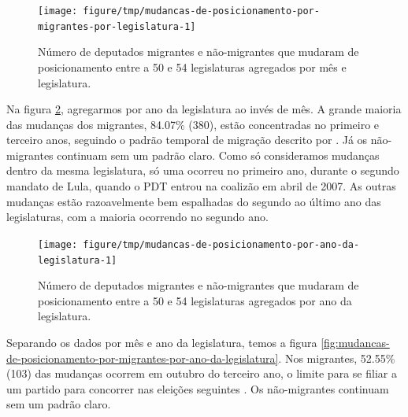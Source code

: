 \documentclass[a4paper,titlepage]{ppgi}\usepackage[]{graphicx}\usepackage[]{color}
\newenvironment{knitrout}{}{} %
\begin{document}
\begin{knitrout}
\color{fgcolor}\begin{figure}
\texttt{[image: figure/tmp/mudancas-de-posicionamento-por-migrantes-por-legislatura-1]} \caption[Número de deputados migrantes e não-migrantes que mudaram de posicionamento entre a 50\textordfeminine{} e 54\textordfeminine{} legislaturas agregados por mês e legislatura]{Número de deputados migrantes e não-migrantes que mudaram de posicionamento entre a 50\textordfeminine{} e 54\textordfeminine{} legislaturas agregados por mês e legislatura.}\label{fig:mudancas-de-posicionamento-por-migrantes-por-legislatura}
\end{figure}


\end{knitrout}

Na figura \ref{fig:mudancas-de-posicionamento-por-ano-da-legislatura},
agregarmos por ano da legislatura ao invés de mês. A grande maioria das
mudanças dos migrantes,
84.07\%
(380), estão concentradas no
primeiro e terceiro anos, seguindo o padrão temporal de migração descrito por
. Já os não-migrantes continuam sem um padrão claro.
Como só consideramos mudanças dentro da mesma legislatura, só uma ocorreu no
primeiro ano, durante o segundo mandato de Lula, quando o PDT entrou na
coalizão em abril de 2007. As outras mudanças estão razoavelmente bem
espalhadas do segundo ao último ano das legislaturas, com a maioria ocorrendo
no segundo ano.

\begin{knitrout}
\color{fgcolor}\begin{figure}
\texttt{[image: figure/tmp/mudancas-de-posicionamento-por-ano-da-legislatura-1]} \caption[Número de deputados migrantes e não-migrantes que mudaram de posicionamento entre a 50\textordfeminine{} e 54\textordfeminine{} legislaturas agregados por ano da legislatura]{Número de deputados migrantes e não-migrantes que mudaram de posicionamento entre a 50\textordfeminine{} e 54\textordfeminine{} legislaturas agregados por ano da legislatura.}\label{fig:mudancas-de-posicionamento-por-ano-da-legislatura}
\end{figure}


\end{knitrout}

Separando os dados por mês e ano da legislatura, temos a figura
\ref{fig:mudancas-de-posicionamento-por-migrantes-por-ano-da-legislatura}. Nos
migrantes,
52.55\%
(103) das mudanças ocorrem
em outubro do terceiro ano, o limite para se filiar a um partido para concorrer
nas eleições seguintes \cite{Lei9504/1997}. Os não-migrantes continuam sem um
padrão claro.
\end{document}
